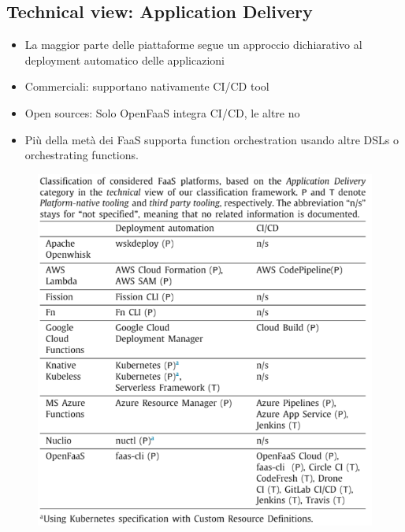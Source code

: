 \documentclass[a4paper, 12pt]{report}
\begin{document}
            \subsection{Technical view: Application Delivery}
            \begin{itemize}
              \item La maggior parte delle piattaforme segue un approccio dichiarativo al deployment automatico delle applicazioni
              \item Commerciali: supportano nativamente CI/CD tool
              \item Open sources: Solo OpenFaaS integra CI/CD, le altre no
            \end{itemize}
            \begin{itemize}
              \item Più della metà dei FaaS supporta function orchestration usando altre DSLs o orchestrating functions.
            \end{itemize}
            \begin{figure}[h]
              \centering
              \includegraphics[scale=0.3]{Immagini/ApplicationDelivery.png}
            \end{figure}
\end{document}
